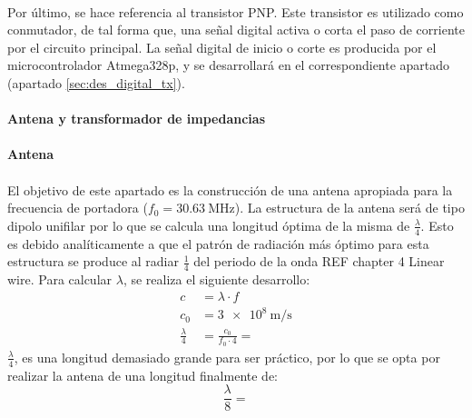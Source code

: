 \paragraph{} 
Por último, se hace referencia al transistor PNP. %
Este transistor es utilizado como conmutador, de tal forma que, una señal digital activa o corta el paso de corriente por el circuito principal. La señal digital de inicio o corte es producida por el microcontrolador Atmega328p, y se desarrollará en el correspondiente apartado (apartado \ref{sec:des_digital_tx}).

\paragraph{Antena y transformador de impedancias} 
\paragraph{Antena}
\paragraph{}
El objetivo de este apartado es la construcción de una antena apropiada para la frecuencia de portadora ($f_0 = \SI{30.63}{\mega\hertz}$).
La estructura de la antena será de tipo dipolo unifilar por lo que se calcula una longitud óptima de la misma de $\frac{\lambda}{4}$.
Esto es debido analíticamente a que el patrón de radiación más óptimo para esta estructura se produce al radiar $\frac{1}{4}$ del periodo de la onda REF chapter 4 Linear wire. Para calcular $\lambda$, se realiza el siguiente desarrollo:
\begin{align}
   c &= \lambda \cdot f \\
   c_0 &= \SI{3e8}{\metre\per\second} \\
   \frac{\lambda}{4} &= \frac{c_0}{f_0 \cdot 4} = 
\end{align}
$\frac{\lambda}{4}$, es una longitud demasiado grande para ser práctico, por lo que se opta por realizar la antena de una longitud finalmente de: $$\frac{\lambda}{8} = $$ 
